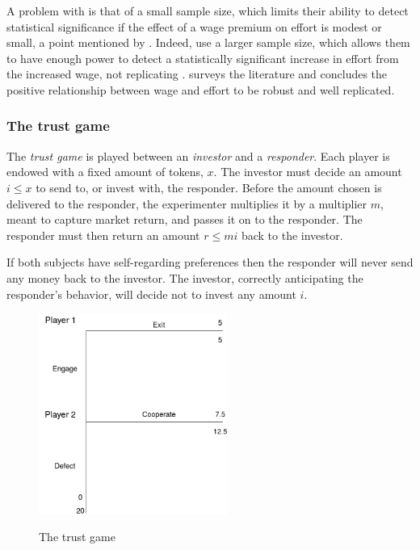 \documentclass[12pt]{article}
\begin{document}
A problem with \cite{Gneezy2006} is that of a small sample size, which limits their ability to detect statistical significance if the effect of a wage premium on effort is modest or small, a point mentioned by \cite{Fehr2009}. Indeed, \cite{cohn2008fairness} use a larger sample size, which allows them to have enough power to detect a statistically significant increase in effort from the increased wage, not replicating \cite{Gneezy2006}. \cite{Fehr2009} surveys the literature and concludes the positive relationship between wage and effort to be robust and well replicated. 



\subsubsection{The trust game}


The \textit{trust game} is played between an \textit{investor} and a \textit{responder}. Each player is endowed with a fixed amount of tokens, $x$. The investor must decide an amount $i \leq x$ to send to, or invest with, the responder. Before the amount chosen is delivered to the responder, the experimenter multiplies it by a multiplier $m$, meant to capture market return, and passes it on to the responder. The responder must then return an amount $r \leq mi$ back to the investor. 

If both subjects have self-regarding preferences then the responder will never send any money back to the investor. The investor, correctly anticipating the responder's behavior, will decide not to invest any amount $i$.
\\

\begin{figure}[H]
    \centering
    \caption{The trust game}
    \includegraphics[width=0.55\textwidth]{trustgame.png}
    \label{fig:trustgame}
\end{figure}
\end{document}
